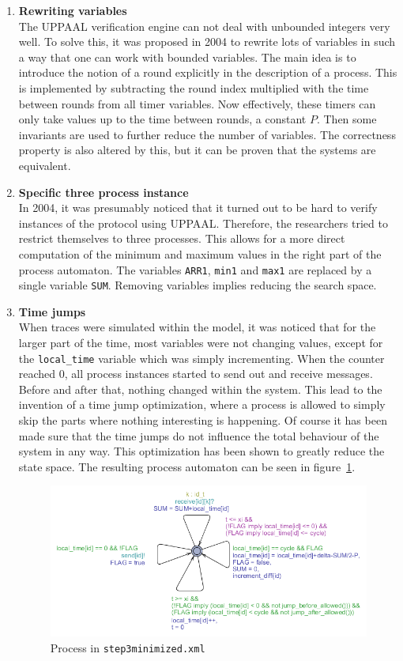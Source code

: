 \documentclass[a4paper,10pt]{article}
\newcommand{\UPPAAL}{UPPAAL\xspace}
\begin{document}
\begin{enumerate}
\item \textbf{Rewriting variables} \\
	The \UPPAAL verification engine can not deal with unbounded integers very well. To solve this, it was proposed in 2004 to rewrite lots of variables in such a way that one can work with bounded variables. The main idea is to introduce the notion of a round explicitly in the description of a process. This is implemented by subtracting the round index multiplied with the time between rounds from all timer variables. Now effectively, these timers can only take values up to the time between rounds, a constant \(P\). Then some invariants are used to further reduce the number of variables. The correctness property is also altered by this, but it can be proven that the systems are equivalent.

\item \textbf{Specific three process instance} \\
	In 2004, it was presumably noticed that it turned out to be hard to verify instances of the protocol using \UPPAAL. Therefore, the researchers tried to restrict themselves to three processes. This allows for a more direct computation of the minimum and maximum values in the right part of the process automaton. The variables \texttt{ARR1}, \texttt{min1} and \texttt{max1} are replaced by a single variable \texttt{SUM}. Removing variables implies reducing the search space.

\item \textbf{Time jumps} \\
	When traces were simulated within the model, it was noticed that for the larger part of the time, most variables were not changing values, except for the \texttt{local\_time} variable which was simply incrementing. When the counter reached 0, all process instances started to send out and receive messages. Before and after that, nothing changed within the system. This lead to the invention of a time jump optimization, where a process is allowed to simply skip the parts where nothing interesting is happening. Of course it has been made sure that the time jumps do not influence the total behaviour of the system in any way. This optimization has been shown to greatly reduce the state space. The resulting process automaton can be seen in figure~\ref{fig:step3minimized_process}.

\begin{figure}[!h]
\includegraphics[width=\textwidth]{step3minimized_process}
\caption{Process in \texttt{step3minimized.xml}\label{fig:step3minimized_process}}
\end{figure}


\end{enumerate}
\end{document}
